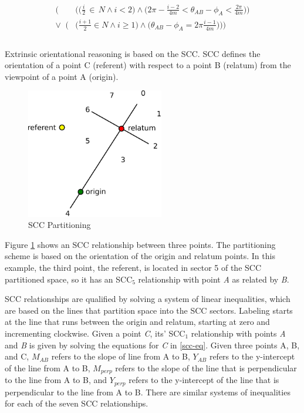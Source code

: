 \documentclass[12pt]{ucthesis}
\begin{document}
\begin{equation}\label{opra-eq}
\begin{aligned}
\Big(&\Big(\Big(\frac{i}{2} \, \in \, N \wedge i < 2\Big) \wedge \Big(2\pi - \frac{i-2}{4m} < \theta_{AB} - \phi_{A} < \frac{2\pi}{4m}\Big)\Big) \\
\lor \;\; \Big(&\Big(\frac{i+1}{2} \in N \wedge i \geq 1\Big) \wedge \Big(\theta_{AB} - \phi_{A} = 2\pi \frac{i-1}{4m}\Big)\Big)\Big) \\ \\
\end{aligned}
\end{equation}

Extrinsic orientational reasoning is based on the SCC. SCC defines the orientation of a point C (referent) with respect to a point B (relatum) from the viewpoint of a point A (origin).

\begin{figure}[H]
\centering
\includegraphics[width=60mm]{scc}
\caption{SCC Partitioning}
\label{scc}
\end{figure}

Figure \ref{scc} shows an SCC relationship between three points. The partitioning scheme is based on the orientation of the origin and relatum points. In this example, the third point, the referent, is located in sector 5 of the SCC partitioned space, so it has an SCC$_{5}$ relationship with point \emph{A} as related by \emph{B}. 

SCC relationships are qualified by solving a system of linear inequalities, which are based on the lines that partition space into the SCC sectors. Labeling starts at the line that runs between the origin and relatum, starting at zero and incrementing clockwise. Given a point \emph{C}, its' SCC$_{1}$ relationship with points \emph{A} and \emph{B} is given by solving the equations for \emph{C} in \ref{scc-eq}. Given three points A, B, and C, $M_{AB}$ refers to the slope of line from A to B, $Y_{AB}$ refers to the y-intercept of the line from A to B, $M_{perp}$ refers to the slope of the line that is perpendicular to the line from A to B, and $Y_{perp}$ refers to the y-intercept of the line that is perpendicular to the line from A to B. There are similar systems of inequalities for each of the seven SCC relationships.  
\end{document}

